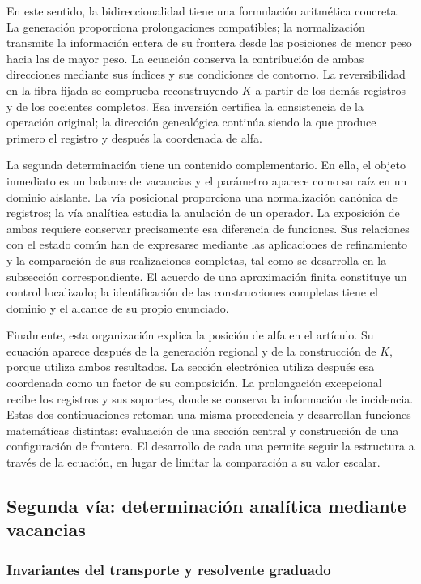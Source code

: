 En este sentido, la bidireccionalidad tiene una formulación aritmética
concreta. La generación proporciona prolongaciones compatibles; la
normalización transmite la información entera de su frontera desde las
posiciones de menor peso hacia las de mayor peso. La ecuación conserva la
contribución de ambas direcciones mediante sus índices y sus condiciones
de contorno. La reversibilidad en la fibra fijada se comprueba reconstruyendo
$K$ a partir de los demás registros y de los cocientes completos. Esa
inversión certifica la consistencia de la operación original; la dirección
genealógica continúa siendo la que produce primero el registro y después
la coordenada de alfa.

La segunda determinación tiene un contenido complementario. En ella, el
objeto inmediato es un balance de vacancias y el parámetro aparece como
su raíz en un dominio aislante. La vía posicional proporciona una
normalización canónica de registros; la vía analítica estudia la anulación
de un operador. La exposición de ambas requiere conservar precisamente
esa diferencia de funciones. Sus relaciones con el estado común han de
expresarse mediante las aplicaciones de refinamiento y la comparación de
sus realizaciones completas, tal como se desarrolla en la subsección
correspondiente. El acuerdo de una aproximación finita constituye un
control localizado; la identificación de las construcciones completas
tiene el dominio y el alcance de su propio enunciado.

Finalmente, esta organización explica la posición de alfa en el artículo.
Su ecuación aparece después de la generación regional y de la construcción
de $K$, porque utiliza ambos resultados. La sección electrónica utiliza
después esa coordenada como un factor de su composición. La prolongación
excepcional recibe los registros y sus soportes, donde se conserva la
información de incidencia. Estas dos continuaciones retoman una misma
procedencia y desarrollan funciones matemáticas distintas: evaluación de
una sección central y construcción de una configuración de frontera.
El desarrollo de cada una permite seguir la estructura a través de la
ecuación, en lugar de limitar la comparación a su valor escalar.



\subsection{Segunda vía: determinación analítica mediante vacancias}
\subsubsection{Invariantes del transporte y resolvente graduado}
\label{x_reciprocidad:subsec:alpha-via-b}

